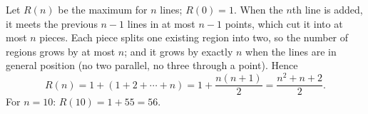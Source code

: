Let $R(n)$ be the maximum for $n$ lines; $R(0)=1$. When the $n$th line is added, it meets the previous $n-1$ lines in at most $n-1$ points, which cut it into at most $n$ pieces. Each piece splits one existing region into two, so the number of regions grows by at most $n$; and it grows by exactly $n$ when the lines are in general position (no two parallel, no three through a point). Hence
\[
R(n)=1+(1+2+\cdots+n)=1+\dfrac{n(n+1)}{2}=\dfrac{n^2+n+2}{2}.
\]
For $n=10$: $R(10)=1+55=\boxed{56}$.
